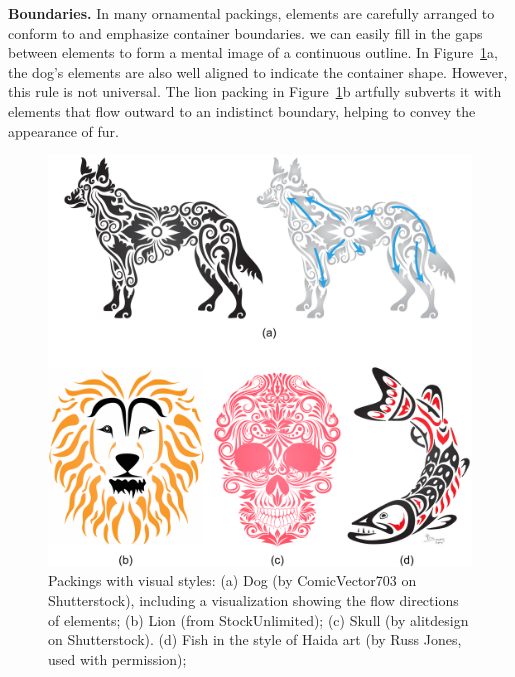 \begin{items}
\item \textbf{Boundaries.} In many ornamental packings, elements are
  carefully arranged to conform to and emphasize container boundaries.
  we can easily
  fill in the gaps between elements to form a mental image of a continuous
  outline.
  In Figure~\ref{fig_dog_flow}a, the dog's elements are also well aligned to indicate the
  container shape. 
  However, this rule is not universal.  
  The lion packing in Figure~\ref{fig_dog_flow}b artfully subverts it with elements that flow outward to an
  indistinct boundary, helping to convey the appearance of fur.
\end{items}

\begin{figure}
\centering
\includegraphics[width=1.0\textwidth]{figures/intro/dog_ornament_flow.pdf} 
\caption[Packings with flow visual styles]
{\label{fig_dog_flow} 
\newtext
{
Packings with  visual styles:}
(a) Dog (by ComicVector703 on Shutterstock), 
including a visualization showing the flow directions of elements; 
(b) Lion (from StockUnlimited);  
(c) Skull (by alitdesign on Shutterstock).
(d) Fish in the style of Haida art (by Russ Jones, used with permission); 
 }
\end{figure}

